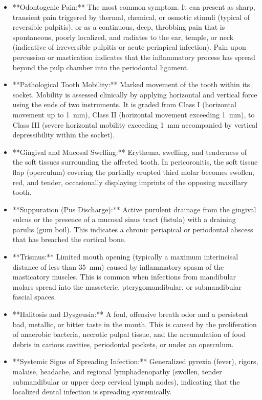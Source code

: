 \begin{itemize}
  \item **Odontogenic Pain:** The most common symptom. It can present as sharp, transient pain triggered by thermal, chemical, or osmotic stimuli (typical of reversible pulpitis), or as a continuous, deep, throbbing pain that is spontaneous, poorly localized, and radiates to the ear, temple, or neck (indicative of irreversible pulpitis or acute periapical infection). Pain upon percussion or mastication indicates that the inflammatory process has spread beyond the pulp chamber into the periodontal ligament.
  \item **Pathological Tooth Mobility:** Marked movement of the tooth within its socket. Mobility is assessed clinically by applying horizontal and vertical force using the ends of two instruments. It is graded from Class I (horizontal movement up to 1~mm), Class II (horizontal movement exceeding 1~mm), to Class III (severe horizontal mobility exceeding 1~mm accompanied by vertical depressibility within the socket).
  \item **Gingival and Mucosal Swelling:** Erythema, swelling, and tenderness of the soft tissues surrounding the affected tooth. In pericoronitis, the soft tissue flap (operculum) covering the partially erupted third molar becomes swollen, red, and tender, occasionally displaying imprints of the opposing maxillary tooth.
  \item **Suppuration (Pus Discharge):** Active purulent drainage from the gingival sulcus or the presence of a mucosal sinus tract (fistula) with a draining parulis (gum boil). This indicates a chronic periapical or periodontal abscess that has breached the cortical bone.
  \item **Trismus:** Limited mouth opening (typically a maximum interincisal distance of less than 35~mm) caused by inflammatory spasm of the masticatory muscles. This is common when infections from mandibular molars spread into the masseteric, pterygomandibular, or submandibular fascial spaces.
  \item **Halitosis and Dysgeusia:** A foul, offensive breath odor and a persistent bad, metallic, or bitter taste in the mouth. This is caused by the proliferation of anaerobic bacteria, necrotic pulpal tissue, and the accumulation of food debris in carious cavities, periodontal pockets, or under an operculum.
  \item **Systemic Signs of Spreading Infection:** Generalized pyrexia (fever), rigors, malaise, headache, and regional lymphadenopathy (swollen, tender submandibular or upper deep cervical lymph nodes), indicating that the localized dental infection is spreading systemically.
\end{itemize}

